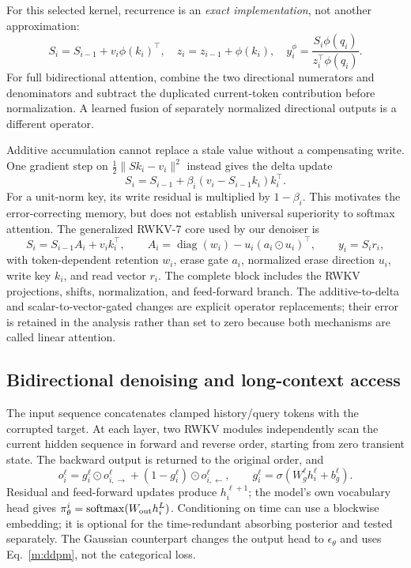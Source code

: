 \documentclass{article}
\theoremstyle{remark}\newtheorem{remark}[theorem]{Remark}
\newcommand{\diag}{\operatorname{diag}}
\begin{document}
For this selected kernel, recurrence is an \emph{exact implementation}, not another approximation:
\begin{equation}
S_i=S_{i-1}+v_i\phi(k_i)^\top,\quad z_i=z_{i-1}+\phi(k_i),\quad
 y_i^\phi=\frac{S_i\phi(q_i)}{z_i^\top\phi(q_i)}.
\label{m:additive}
\end{equation}
For full bidirectional attention, combine the two directional numerators and denominators and subtract the duplicated current-token contribution before normalization. A learned fusion of separately normalized directional outputs is a different operator.

Additive accumulation cannot replace a stale value without a compensating write. One gradient step on $\frac12\|Sk_i-v_i\|^2$ instead gives the delta update
\begin{equation}
S_i=S_{i-1}+\beta_i(v_i-S_{i-1}k_i)k_i^\top.
\label{m:delta}
\end{equation}
For a unit-norm key, its write residual is multiplied by $1-\beta_i$. This motivates the error-correcting memory, but does not establish universal superiority to softmax attention. The generalized RWKV-7 core used by our denoiser is
\begin{equation}
S_i=S_{i-1}A_i+v_i k_i^\top,\qquad
A_i=\diag(w_i)-u_i(a_i\odot u_i)^\top,
\qquad y_i=S_i r_i,
\label{m:rwkv}
\end{equation}
with token-dependent retention $w_i$, erase gate $a_i$, normalized erase direction $u_i$, write key $k_i$, and read vector $r_i$. The complete block includes the RWKV projections, shifts, normalization, and feed-forward branch. The additive-to-delta and scalar-to-vector-gated changes are explicit operator replacements; their error is retained in the analysis rather than set to zero because both mechanisms are called linear attention.

\subsection{Bidirectional denoising and long-context access}
The input sequence concatenates clamped history/query tokens with the corrupted target. At each layer, two RWKV modules independently scan the current hidden sequence in forward and reverse order, starting from zero transient state. The backward output is returned to the original order, and
\begin{equation}
 o_i^\ell=g_i^\ell\odot o_{i,\rightarrow}^\ell+(1-g_i^\ell)\odot o_{i,\leftarrow}^\ell,
 \qquad g_i^\ell=\sigma(W_g^\ell h_i^\ell+b_g^\ell).
\label{m:fuse}
\end{equation}
Residual and feed-forward updates produce $h_i^{\ell+1}$; the model's own vocabulary head gives $\pi_\theta^i=\operatorname{softmax}(W_{\rm out}h_i^L)$. Conditioning on time can use a blockwise embedding; it is optional for the time-redundant absorbing posterior and tested separately. The Gaussian counterpart changes the output head to $\epsilon_\theta$ and uses Eq.~\eqref{m:ddpm}, not the categorical loss.
\end{document}
